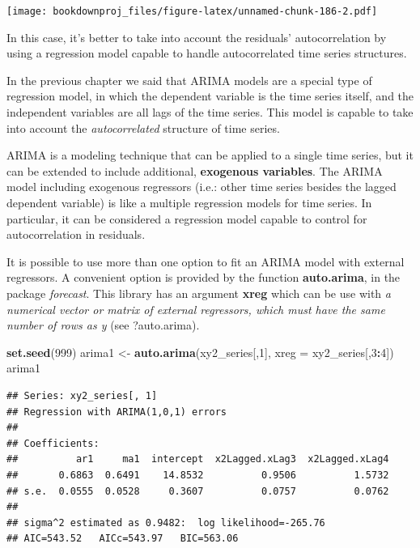 \documentclass[
]{article}
\newenvironment{Shaded}{\begin{snugshade}}{\end{snugshade}}
\newcommand{\DataTypeTok}[1]{\textcolor[rgb]{0.13,0.29,0.53}{#1}}
\newcommand{\DecValTok}[1]{\textcolor[rgb]{0.00,0.00,0.81}{#1}}
\newcommand{\KeywordTok}[1]{\textcolor[rgb]{0.13,0.29,0.53}{\textbf{#1}}}
\newcommand{\NormalTok}[1]{#1}
\newcommand{\OperatorTok}[1]{\textcolor[rgb]{0.81,0.36,0.00}{\textbf{#1}}}
\newcommand{\StringTok}[1]{\textcolor[rgb]{0.31,0.60,0.02}{#1}}
\begin{document}
\begin{Shaded}
\end{Shaded}

\texttt{[image: bookdownproj\_files/figure-latex/unnamed-chunk-186-2.pdf]}

In this case, it's better to take into account the residuals' autocorrelation by using a regression model capable to handle autocorrelated time series structures.

In the previous chapter we said that ARIMA models are a special type of regression model, in which the dependent variable is the time series itself, and the independent variables are all lags of the time series. This model is capable to take into account the \emph{autocorrelated} structure of time series.

ARIMA is a modeling technique that can be applied to a single time series, but it can be extended to include additional, \textbf{exogenous variables}. The ARIMA model including exogenous regressors (i.e.: other time series besides the lagged dependent variable) is like a multiple regression models for time series. In particular, it can be considered a regression model capable to control for autocorrelation in residuals.

It is possible to use more than one option to fit an ARIMA model with external regressors. A convenient option is provided by the function \textbf{auto.arima}, in the package \emph{forecast}. This library has an argument \textbf{xreg} which can be use with \emph{a numerical vector or matrix of external regressors, which must have the same number of rows as y} (see ?auto.arima).

\begin{Shaded}
\begin{Highlighting}[]
\KeywordTok{set.seed}\NormalTok{(}\DecValTok{999}\NormalTok{)}
\NormalTok{arima1 <-}\StringTok{ }\KeywordTok{auto.arima}\NormalTok{(xy2_series[,}\DecValTok{1}\NormalTok{], }\DataTypeTok{xreg =}\NormalTok{ xy2_series[,}\DecValTok{3}\OperatorTok{:}\DecValTok{4}\NormalTok{])}
\NormalTok{arima1}
\end{Highlighting}
\end{Shaded}

\begin{verbatim}
## Series: xy2_series[, 1] 
## Regression with ARIMA(1,0,1) errors 
## 
## Coefficients:
##          ar1     ma1  intercept  x2Lagged.xLag3  x2Lagged.xLag4
##       0.6863  0.6491    14.8532          0.9506          1.5732
## s.e.  0.0555  0.0528     0.3607          0.0757          0.0762
## 
## sigma^2 estimated as 0.9482:  log likelihood=-265.76
## AIC=543.52   AICc=543.97   BIC=563.06
\end{verbatim}
\end{document}
